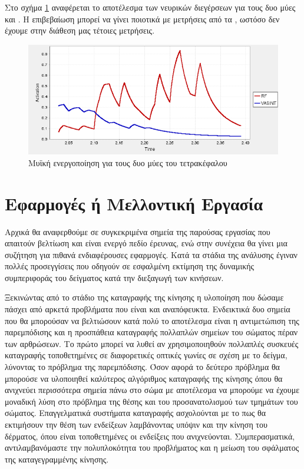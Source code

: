 Στο σχήμα \ref{fig:rf-vasint-activation} αναφέρεται το αποτέλεσμα των νευρικών διεγέρσεων για τους δυο μύες  και . Η επιβεβαίωση μπορεί να γίνει ποιοτικά με μετρήσεις από τα , ωστόσο δεν έχουμε στην διάθεση μας τέτοιες μετρήσεις.

\begin{figure}[H]
    \centering
    \includegraphics[width=0.8\linewidth, keepaspectratio]{fig/rf-vasint-activation.png}
    \caption{Μυϊκή ενεργοποίηση για τους δυο μύες του τετρακέφαλου}
    \label{fig:rf-vasint-activation}
\end{figure}

\section{Εφαρμογές ή Μελλοντική Εργασία}

Αρχικά θα αναφερθούμε σε συγκεκριμένα σημεία της παρούσας εργασίας που απαιτούν βελτίωση και είναι ενεργό πεδίο έρευνας, ενώ στην συνέχεια θα γίνει μια συζήτηση για πιθανά ενδιαφέρουσες εφαρμογές. Κατά τα στάδια της ανάλυσης έγιναν πολλές προσεγγίσεις που οδηγούν σε εσφαλμένη εκτίμηση της δυναμικής συμπεριφοράς του δείγματος κατά την διεξαγωγή των κινήσεων. 

Ξεκινώντας από το στάδιο της καταγραφής της κίνησης η υλοποίηση που δώσαμε πάσχει από αρκετά προβλήματα που είναι και αναπόφευκτα. Ενδεικτικά δυο σημεία που θα μπορούσαν να βελτιώσουν κατά πολύ το αποτέλεσμα είναι η αντιμετώπιση της παρεμπόδισης και η προσπάθεια καταγραφής πολλαπλών σημείων του σώματος πέραν των αρθρώσεων. Το πρώτο μπορεί να λυθεί αν χρησιμοποιηθούν πολλαπλές συσκευές καταγραφής τοποθετημένες σε διαφορετικές οπτικές γωνίες σε σχέση με το δείγμα, λύνοντας το πρόβλημα της παρεμπόδισης. Όσον αφορά το δεύτερο πρόβλημα θα μπορούσε να υλοποιηθεί καλύτερος αλγόριθμος καταγραφής της κίνησης όπου θα ανιχνεύει περισσότερα σημεία πάνω στο σώμα με αποτέλεσμα να μπορούμε να έχουμε μοναδική λύση στο πρόβλημα της θέσης και του προσανατολισμού των τμημάτων του σώματος. Επαγγελματικά συστήματα καταγραφής ασχολούνται με το πως θα εκτιμήσουν την θέση των ενδείξεων λαμβάνοντας υπόψιν και την κίνηση του δέρματος, όπου είναι τοποθετημένες οι ενδείξεις που ανιχνεύονται. Συμπερασματικά, αντιλαμβανόμαστε την πολυπλοκότητα του προβλήματος και η μείωση του σφάλματος της καταγεγραμμένης κίνησης.

